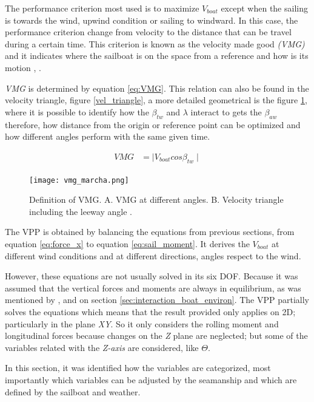 The performance criterion most used is to maximize $V_{boat}$ except when the sailing is towards the wind, upwind condition or sailing to windward. In this case, the performance criterion change from velocity to the distance that can be travel during a certain time.  This criterion is known as the velocity made good \textit{(VMG)} and it indicates where the sailboat is on the space from a reference and how is its motion \cite{larsonprinciples}, \cite{marchajaereo1979} \cite{philpott1993yacht}. \par 
\noindent
\textit{VMG} is determined by equation \ref{eq:VMG}. This relation can also be found in the velocity triangle, figure \ref{vel_triangle}, a more detailed geometrical is the figure \ref{fig:vmg_marchal_book}, where it is possible to identify how the $\beta_{tw}$ and $\lambda$ interact to gets the $\beta_{aw}$ therefore, how distance from the origin or reference point can be optimized and how different angles perform with the same given time. \par
{}

\begin{equation}\label{eq:VMG}
\begin{aligned}
VMG &=  \mid V_{boat} cos \beta_{tw} \mid 
\end{aligned}
\end {equation}

\begin{figure}
    \centering
    \texttt{[image: vmg\_marcha.png]}
    \caption{Definition of VMG. A. VMG at  different angles. B. Velocity triangle including the leeway angle \cite{marchajaereo1979}.}
    \label{fig:vmg_marchal_book}
\end{figure}

The VPP is obtained by balancing the equations from previous sections, from equation \ref{eq:force_x} to equation \ref{eq:sail_moment}. It derives the $V_{boat}$ at different wind conditions and at different directions, angles respect to the wind. 

However, these equations are not usually solved in its six DOF. Because it was assumed that the vertical forces and moments are always in equilibrium, as was mentioned by \cite{larsonprinciples}, \cite{fossati2009aero} and on section \ref{sec:interaction_boat_environ}. The VPP partially solves the equations which means that the result provided only applies on 2D; particularly in the plane \textit{XY}. So it only considers the rolling moment and longitudinal forces  because changes on the \textit{Z} plane are neglected; but some of the variables related with the \textit{Z-axis} are considered, like $\Theta$. \par 
In this section, it was identified how the variables are categorized, most importantly which variables can be adjusted by the seamanship and which are defined by the sailboat and weather.


